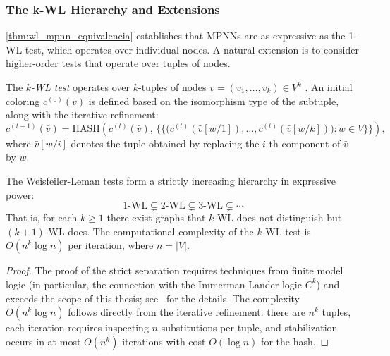 \subsubsection{The k-WL Hierarchy and Extensions}\label{subsubsec:jerarquia_kwl}

\autoref{thm:wl_mpnn_equivalencia} establishes that \glspl{MPNN} are as expressive as the 1-WL test, which operates over individual nodes. A natural extension is to consider higher-order tests that operate over tuples of nodes.

\begin{definition}\label{def:k_wl}
	The \textit{$k$-\gls{WL} test} operates over $k$-tuples of nodes $\bar{v} = (v_1, \ldots, v_k) \in V^k$ \citep{morris2019weisfeiler}. An initial coloring $c^{(0)}(\bar{v})$ is defined based on the isomorphism type of the subtuple, along with the iterative refinement:
	\[
		c^{(t+1)}(\bar{v}) = \mathrm{HASH}\!\left(c^{(t)}(\bar{v}),\, \bigl\{\!\!\bigl\{ \bigl(c^{(t)}(\bar{v}[w/1]), \ldots, c^{(t)}(\bar{v}[w/k])\bigr) : w \in V \bigr\}\!\!\bigr\}\right),
	\]
	where $\bar{v}[w/i]$ denotes the tuple obtained by replacing the $i$-th component of $\bar{v}$ by $w$.
\end{definition}

\begin{proposition}\label{prop:jerarquia_kwl}
	The Weisfeiler-Leman tests form a strictly increasing hierarchy in expressive power:
	\[
		1\text{-WL} \subsetneq 2\text{-WL} \subsetneq 3\text{-WL} \subsetneq \cdots
	\]
	That is, for each $k \geq 1$ there exist graphs that $k$-WL does not distinguish but $(k+1)$-WL does. The computational complexity of the $k$-WL test is $O(n^k \log n)$ per iteration, where $n = |V|$.
\end{proposition}

\begin{proof}
	The proof of the strict separation requires techniques from finite model logic (in particular, the connection with the Immerman-Lander logic $C^k$) and exceeds the scope of this thesis; see~\citet{morris2019weisfeiler} for the details. The complexity $O(n^k \log n)$ follows directly from the iterative refinement: there are $n^k$ tuples, each iteration requires inspecting $n$ substitutions per tuple, and stabilization occurs in at most $O(n^k)$ iterations with cost $O(\log n)$ for the hash.
\end{proof}

